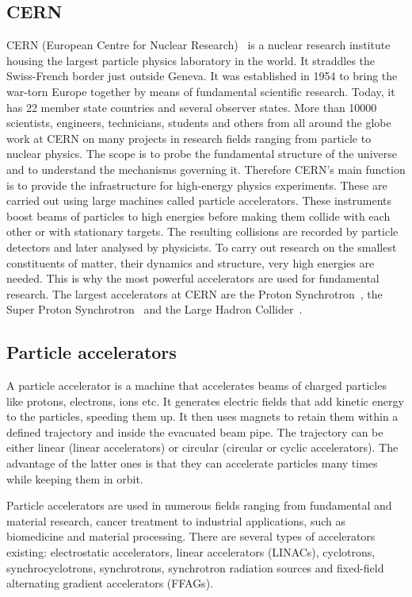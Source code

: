 \subsection{CERN}
CERN (European Centre for Nuclear Research)~\cite{CERN:00000} is a nuclear research institute housing the largest particle physics laboratory in the world. It straddles the Swiss-French border just outside Geneva. It was established in 1954 to bring the war-torn Europe together by means of fundamental scientific research. Today, it has 22 member state countries and several observer states. More than 10000 scientists, engineers, technicians, students and others from all around the globe work at CERN on many projects in research fields ranging from particle to nuclear physics. The scope is to probe the fundamental structure of the universe and to understand the mechanisms governing it. Therefore CERN's main function is to provide the infrastructure for high-energy physics experiments. These are carried out using large machines called particle accelerators. These instruments boost beams of particles to high energies before making them collide with each other or with stationary targets. The resulting collisions are recorded by particle detectors and later analysed by physicists. To carry out research on the smallest constituents of matter, their dynamics and structure, very high energies are needed. This is why the most powerful accelerators are used for fundamental research. The largest accelerators at CERN are the Proton Synchrotron~\cite{}, the Super Proton Synchrotron~\cite{Mills:133232} and the Large Hadron Collider~\cite{}.

\subsection{Particle accelerators}
A particle accelerator is a machine that accelerates beams of charged particles like protons, electrons, ions etc. It generates electric fields that add kinetic energy to the particles, speeding them up. It then uses magnets to retain them within a defined trajectory and inside the evacuated beam pipe. The trajectory can be either linear (linear accelerators) or circular (circular or cyclic accelerators). The advantage of the latter ones is that they can accelerate particles many times while keeping them in orbit.

Particle accelerators are used in numerous fields ranging from fundamental and material research, cancer treatment to industrial applications, such as biomedicine and material processing. There are several types of accelerators existing: electrostatic accelerators, linear accelerators (LINACs), cyclotrons, synchrocyclotrons, synchrotrons, synchrotron radiation sources and fixed-field alternating gradient accelerators (FFAGs).

